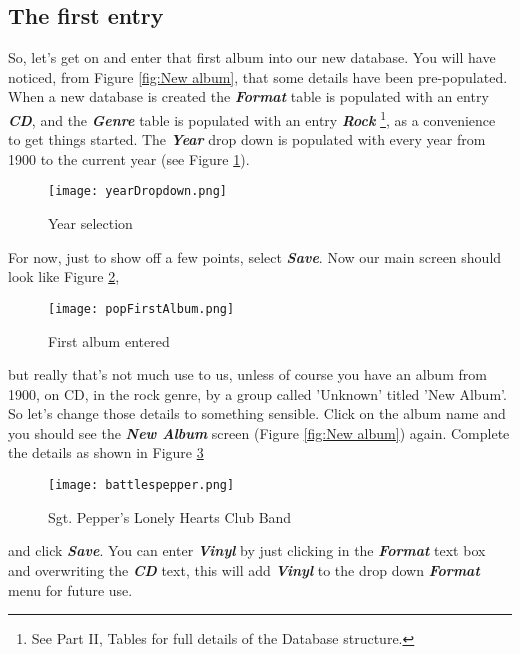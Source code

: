 \subsection{The first entry}
So, let's get on and enter that first album into our new database.  You will have noticed, from Figure
\ref{fig:New album},
that some details have been pre-populated.  When a new database is created the 
\textit{\textbf{Format}}
table is populated with an entry 
\textit{\textbf{CD}}, 
and the
\textit{\textbf{Genre}} 
table is populated with an entry 
\textit{\textbf{Rock}} 
\footnote{See Part II, Tables for  full details of the Database structure.},
as a convenience to get things started.  The 
\textit{\textbf{Year}} 
drop down is populated with every year from 1900 to the current year (see Figure 
\ref{fig:Year selection}).
\begin{figure}[!h]
 \centering
 \texttt{[image: yearDropdown.png]}
 \caption{Year selection}
 \label{fig:Year selection}
\end{figure}
\newpage 
For now, just to show off a few points, select
\textbf{\textit{Save}}.
Now our main screen should look like Figure
\ref{fig:First album entered},
\begin{figure}[!h]
 \texttt{[image: popFirstAlbum.png]} 
 \caption{First album entered}
 \label{fig:First album entered}
\end{figure}
but really that's not much use to us, unless of course you have an album from 1900, on CD, in the rock genre, by a group called 'Unknown' titled 'New Album'.  So let's change those details to something sensible. Click on the album name and you should see the
\textit{\textbf{New Album}}
screen (Figure 
\ref{fig:New album})
again.  Complete the details as shown in Figure
\ref{fig:Sgt. Pepper's Lonely Hearts Club Band}
\begin{figure}[!h]
 \texttt{[image: battlespepper.png]}
 \caption{Sgt. Pepper's Lonely Hearts Club Band}
 \label{fig:Sgt. Pepper's Lonely Hearts Club Band}
\end{figure}
and click 
\textbf{\textit{Save}}.
You can enter
\textbf{\textit{Vinyl}}
by just clicking in the
\textbf{\textit{Format}}
text box and overwriting the
\textbf{\textit{CD}}
text, this will add
\textbf{\textit{Vinyl}}
to the drop down 
\textbf{\textit{Format}}
menu for future use.

